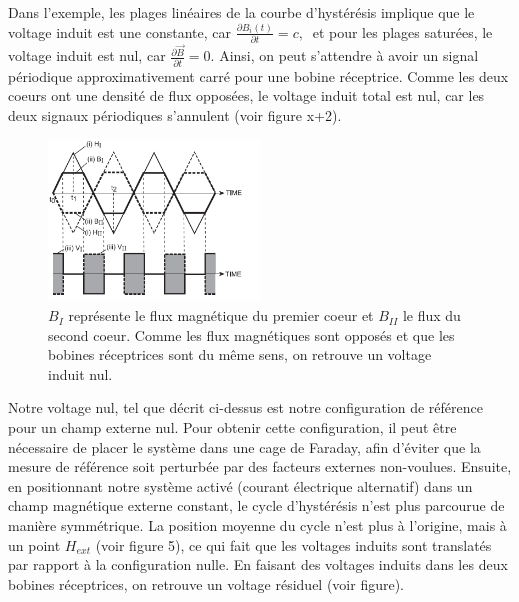 \documentclass{standalone}
\begin{document}
Dans l'exemple, les plages linéaires de la courbe d'hystérésis implique que le voltage induit est une constante, car $\frac{\partial B_i(t)}{\partial t} = c, \ $ et pour les plages saturées, le voltage induit est nul, car $\frac{\partial \vec{B}}{\partial t} = 0$. Ainsi, on peut s'attendre à avoir un signal périodique approximativement carré pour une bobine réceptrice. Comme les deux coeurs ont une densité de flux opposées, le voltage induit total est nul, car les deux signaux périodiques s'annulent (voir figure x+2). 

\begin{figure}[H]
\begin{center}
\includegraphics[width=0.50\textwidth]{voltage1}
\caption{$B_I$ représente le flux magnétique du premier coeur et $B_{II}$ le flux du second coeur. Comme les flux magnétiques sont opposés et que les bobines réceptrices sont du même sens, on retrouve un voltage induit nul.}
\end{center}
\end{figure} 

Notre voltage nul, tel que décrit ci-dessus est notre configuration de référence pour un champ externe nul. Pour obtenir cette configuration, il peut être nécessaire de placer le système dans une cage de Faraday, afin d'éviter que la mesure de référence soit perturbée par des facteurs externes non-voulues. Ensuite, en positionnant notre système activé (courant électrique alternatif) dans un champ magnétique externe constant, le cycle d'hystérésis n'est plus parcourue de manière symmétrique. La position moyenne du cycle n'est plus à l'origine, mais à un point $H_{ext}$ (voir figure 5), ce qui fait que les voltages induits sont translatés par rapport à la configuration nulle. En faisant des voltages induits dans les deux bobines réceptrices, on retrouve un voltage résiduel (voir figure).
\end{document}
